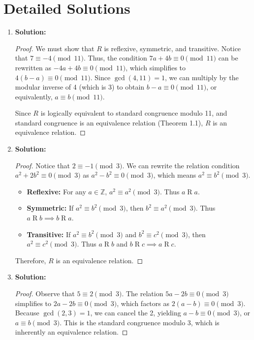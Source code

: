 \documentclass[11pt, a4paper]{article}
\theoremstyle{definition}
\theoremstyle{remark}
\newcommand{\Z}{\mathbb{Z}}
\begin{document}
\newpage

\section{Detailed Solutions}

\begin{enumerate}[label=\textbf{\arabic*.}]
    
    \item \textbf{Solution:}
    \begin{proof}
    We must show that $R$ is reflexive, symmetric, and transitive. Notice that $7 \equiv -4 \pmod{11}$. Thus, the condition $7a + 4b \equiv 0 \pmod{11}$ can be rewritten as $-4a + 4b \equiv 0 \pmod{11}$, which simplifies to $4(b - a) \equiv 0 \pmod{11}$. Since $\gcd(4, 11) = 1$, we can multiply by the modular inverse of 4 (which is 3) to obtain $b - a \equiv 0 \pmod{11}$, or equivalently, $a \equiv b \pmod{11}$. 
    
    Since $R$ is logically equivalent to standard congruence modulo 11, and standard congruence is an equivalence relation (Theorem 1.1), $R$ is an equivalence relation.
    \end{proof}

    \item \textbf{Solution:}
    \begin{proof}
    Notice that $2 \equiv -1 \pmod{3}$. We can rewrite the relation condition $a^2 + 2b^2 \equiv 0 \pmod{3}$ as $a^2 - b^2 \equiv 0 \pmod{3}$, which means $a^2 \equiv b^2 \pmod{3}$.
    \begin{itemize}
        \item \textbf{Reflexive:} For any $a \in \Z$, $a^2 \equiv a^2 \pmod{3}$. Thus $a \mathrel{R} a$.
        \item \textbf{Symmetric:} If $a^2 \equiv b^2 \pmod{3}$, then $b^2 \equiv a^2 \pmod{3}$. Thus $a \mathrel{R} b \implies b \mathrel{R} a$.
        \item \textbf{Transitive:} If $a^2 \equiv b^2 \pmod{3}$ and $b^2 \equiv c^2 \pmod{3}$, then $a^2 \equiv c^2 \pmod{3}$. Thus $a \mathrel{R} b$ and $b \mathrel{R} c \implies a \mathrel{R} c$.
    \end{itemize}
    Therefore, $R$ is an equivalence relation.
    \end{proof}

    \item \textbf{Solution:}
    \begin{proof}
    Observe that $5 \equiv 2 \pmod{3}$. The relation $5a - 2b \equiv 0 \pmod{3}$ simplifies to $2a - 2b \equiv 0 \pmod{3}$, which factors as $2(a - b) \equiv 0 \pmod{3}$. Because $\gcd(2, 3) = 1$, we can cancel the 2, yielding $a - b \equiv 0 \pmod{3}$, or $a \equiv b \pmod{3}$. This is the standard congruence modulo 3, which is inherently an equivalence relation.
    \end{proof}


\end{enumerate}
\end{document}

